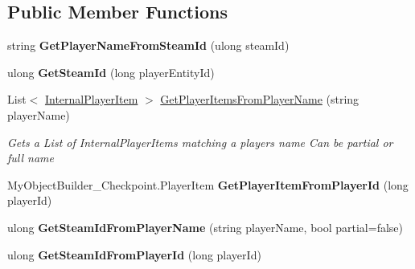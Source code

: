 \subsection*{Public Member Functions}
\begin{DoxyCompactItemize}
\item 
\hypertarget{class_s_e_mod_a_p_i_internal_1_1_a_p_i_1_1_common_1_1_player_map_ad5ec5f609002d77867a8c39522b428ed}{}string {\bfseries Get\+Player\+Name\+From\+Steam\+Id} (ulong steam\+Id)\label{class_s_e_mod_a_p_i_internal_1_1_a_p_i_1_1_common_1_1_player_map_ad5ec5f609002d77867a8c39522b428ed}

\item 
\hypertarget{class_s_e_mod_a_p_i_internal_1_1_a_p_i_1_1_common_1_1_player_map_a3ceef7eb721531e086c4549d02ef615f}{}ulong {\bfseries Get\+Steam\+Id} (long player\+Entity\+Id)\label{class_s_e_mod_a_p_i_internal_1_1_a_p_i_1_1_common_1_1_player_map_a3ceef7eb721531e086c4549d02ef615f}

\item 
List$<$ \hyperlink{struct_s_e_mod_a_p_i_internal_1_1_a_p_i_1_1_common_1_1_player_map_1_1_internal_player_item}{Internal\+Player\+Item} $>$ \hyperlink{class_s_e_mod_a_p_i_internal_1_1_a_p_i_1_1_common_1_1_player_map_a6945c96a172ddb65e68a606c2aa9901e}{Get\+Player\+Items\+From\+Player\+Name} (string player\+Name)
\begin{DoxyCompactList}\small\item\em Gets a List of Internal\+Player\+Items matching a players name Can be partial or full name \end{DoxyCompactList}\item 
\hypertarget{class_s_e_mod_a_p_i_internal_1_1_a_p_i_1_1_common_1_1_player_map_a8f6d70a34ff25631618edcc6427e0e65}{}My\+Object\+Builder\+\_\+\+Checkpoint.\+Player\+Item {\bfseries Get\+Player\+Item\+From\+Player\+Id} (long player\+Id)\label{class_s_e_mod_a_p_i_internal_1_1_a_p_i_1_1_common_1_1_player_map_a8f6d70a34ff25631618edcc6427e0e65}

\item 
\hypertarget{class_s_e_mod_a_p_i_internal_1_1_a_p_i_1_1_common_1_1_player_map_a349a3960132ba3b1d570095e34cf43d9}{}ulong {\bfseries Get\+Steam\+Id\+From\+Player\+Name} (string player\+Name, bool partial=false)\label{class_s_e_mod_a_p_i_internal_1_1_a_p_i_1_1_common_1_1_player_map_a349a3960132ba3b1d570095e34cf43d9}

\item 
\hypertarget{class_s_e_mod_a_p_i_internal_1_1_a_p_i_1_1_common_1_1_player_map_a53f75198654b8f26f9cc8ffb7579c160}{}ulong {\bfseries Get\+Steam\+Id\+From\+Player\+Id} (long player\+Id)\label{class_s_e_mod_a_p_i_internal_1_1_a_p_i_1_1_common_1_1_player_map_a53f75198654b8f26f9cc8ffb7579c160}


\end{DoxyCompactItemize}
